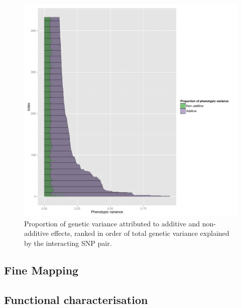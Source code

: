 \documentclass[paper=a4, fontsize=11pt]{scrartcl}	%
\numberwithin{equation}{section}									%
\numberwithin{figure}{section}										%
\numberwithin{table}{section}										%
\begin{document}
\begin{figure}[p]
	\centering
	\includegraphics[width=15cm]{images/proportion_additive}
	\caption{Proportion of genetic variance attributed to additive and non-additive effects, ranked in order of total genetic variance explained by the interacting SNP pair.}
	\label{fig:proportion_additive}
\end{figure}


\subsection{Fine Mapping}

\subsection{Functional characterisation}






\end{document}
